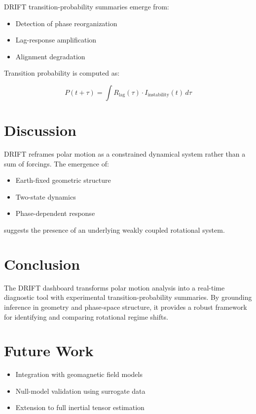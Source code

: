 \documentclass[11pt]{article}
\begin{document}
DRIFT transition-probability summaries emerge from:

\begin{itemize}
\item Detection of phase reorganization
\item Lag-response amplification
\item Alignment degradation
\end{itemize}

Transition probability is computed as:

\begin{equation}
P(t+\tau) = \int R_{\text{lag}}(\tau) \cdot I_{\text{instability}}(t) \, d\tau
\end{equation}

\section{Discussion}

DRIFT reframes polar motion as a constrained dynamical system rather than a sum of forcings. The emergence of:

\begin{itemize}
\item Earth-fixed geometric structure
\item Two-state dynamics
\item Phase-dependent response
\end{itemize}

suggests the presence of an underlying weakly coupled rotational system.

\section{Conclusion}

The DRIFT dashboard transforms polar motion analysis into a real-time diagnostic tool with experimental transition-probability summaries. By grounding inference in geometry and phase-space structure, it provides a robust framework for identifying and comparing rotational regime shifts.

\section*{Future Work}

\begin{itemize}
\item Integration with geomagnetic field models
\item Null-model validation using surrogate data
\item Extension to full inertial tensor estimation
\end{itemize}
\end{document}
